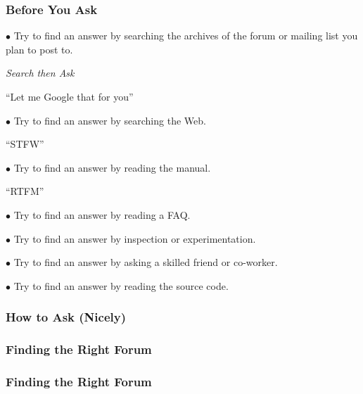 \documentclass{beamer}
\begin{document}
  \begin{frame}
    \frametitle{Before You Ask}
        
    $\bullet$ Try to find an answer by searching the archives of the forum or mailing list you plan to post to.
    \begin{center}
     \textit{Search then Ask}
    \end{center}
    \begin{center}
     ``Let me Google that for you''
    \end{center}

    $\bullet$ Try to find an answer by searching the Web.
    \begin{center}
     ``STFW''
    \end{center}

    $\bullet$ Try to find an answer by reading the manual.
    \begin{center}
     ``RTFM''
    \end{center}

    $\bullet$ Try to find an answer by reading a FAQ.

    $\bullet$ Try to find an answer by inspection or experimentation.

    $\bullet$ Try to find an answer by asking a skilled friend or co-worker.

    $\bullet$ Try to find an answer by reading the source code\footnotemark.
    
  \end{frame}
    \begin{frame}
    \frametitle{How to Ask (Nicely)}
    
    \begin{center}
     
      
    \end{center}  
  \end{frame}
  \begin{frame}
    \frametitle{Finding the Right Forum}
    
    \begin{center}
     
      
    \end{center}  
  \end{frame}
  \begin{frame}
    \frametitle{Finding the Right Forum}
    
    \begin{center}
     
      
    \end{center}  
  \end{frame}
\end{document}
